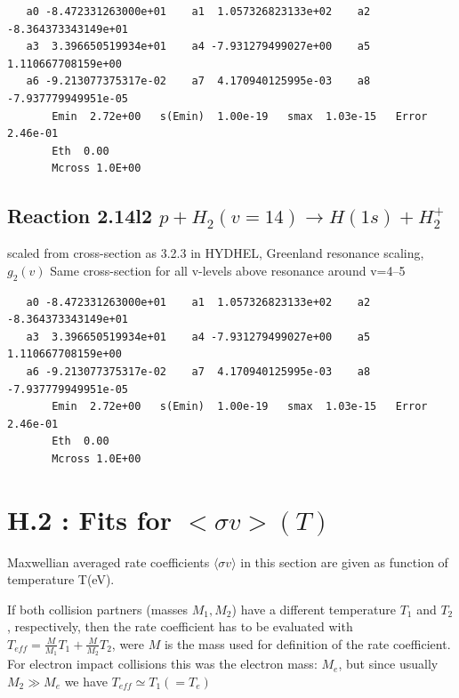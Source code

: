 \documentclass[12pt,dvipdfmx]{article}
\begin{document}
\begin{small}\begin{verbatim}
   a0 -8.472331263000e+01    a1  1.057326823133e+02    a2 -8.364373343149e+01
   a3  3.396650519934e+01    a4 -7.931279499027e+00    a5  1.110667708159e+00
   a6 -9.213077375317e-02    a7  4.170940125995e-03    a8 -7.937779949951e-05
       Emin  2.72e+00   s(Emin)  1.00e-19   smax  1.03e-15   Error  2.46e-01
       Eth  0.00
       Mcross 1.0E+00
\end{verbatim}\end{small}

\subsection{
Reaction 2.14l2 $   p + H_2(v=14) \rightarrow H(1s) + H_2^+$}

scaled from cross-section as 3.2.3 in HYDHEL, Greenland resonance scaling, \cite{kn:Green} $g_2(v)$
Same cross-section for all v-levels above resonance around v=4--5

\begin{small}\begin{verbatim}
   a0 -8.472331263000e+01    a1  1.057326823133e+02    a2 -8.364373343149e+01
   a3  3.396650519934e+01    a4 -7.931279499027e+00    a5  1.110667708159e+00
   a6 -9.213077375317e-02    a7  4.170940125995e-03    a8 -7.937779949951e-05
       Emin  2.72e+00   s(Emin)  1.00e-19   smax  1.03e-15   Error  2.46e-01
       Eth  0.00
       Mcross 1.0E+00
\end{verbatim}\end{small}


\newpage
\section{H.2 :  Fits for $<\sigma v> (T)$}

Maxwellian averaged rate coefficients $\langle \sigma v\rangle$ in this section
are given as function of temperature  T(eV).

If both collision partners (masses $M_1, M_2$) have a different temperature $T_1$ and $T_2$, respectively,
then the rate coefficient has to be evaluated
with $T_{eff} = \frac{M}{M_1} T_1 + \frac{M}{M_2} T_2$,
were $M$ is the mass
used for definition of the rate coefficient.
For electron impact collisions this was the electron mass: $M_e$,
but since usually $M_2 \gg M_e$ we have $T_{eff} \simeq T_1 (=T_e)$ \\
\end{document}
